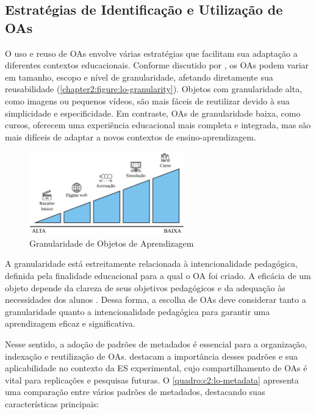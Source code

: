 \subsection{Estratégias de Identificação e Utilização de OAs}

O uso e reuso de OAs envolve várias estratégias que facilitam sua adaptação a diferentes contextos educacionais. Conforme discutido por , os OAs podem variar em tamanho, escopo e nível de granularidade, afetando diretamente sua reusabilidade (\autoref{chapter2:figure:lo-granularity}). Objetos com granularidade alta, como imagens ou pequenos vídeos, são mais fáceis de reutilizar devido à sua simplicidade e especificidade. Em contraste, OAs de granularidade baixa, como cursos, oferecem uma experiência educacional mais completa e integrada, mas são mais difíceis de adaptar a novos contextos de ensino-aprendizagem.

\begin{figure}[htb]
\centering
\caption{Granularidade de Objetos de Aprendizagem}
\label{chapter2:figure:lo-granularity}
\includegraphics[width=0.6\textwidth]{images/chapter2-lo-granularity.jpg}
\end{figure}

A granularidade está estreitamente relacionada à intencionalidade pedagógica, definida pela finalidade educacional para a qual o OA foi criado. A eficácia de um objeto depende da clareza de seus objetivos pedagógicos e da adequação às necessidades dos alunos \cite{Bloom1984}. Dessa forma, a escolha de OAs deve considerar tanto a granularidade quanto a intencionalidade pedagógica para garantir uma aprendizagem eficaz e significativa.

Nesse sentido, a adoção de padrões de metadados é essencial para a organização, indexação e reutilização de OAs.  destacam a importância desses padrões e sua aplicabilidade no contexto da ES experimental, cujo compartilhamento de OAs é vital para replicações e pesquisas futuras. O \autoref{quadro:c2:lo-metadata} apresenta uma comparação entre vários padrões de metadados, destacando suas características principais:

